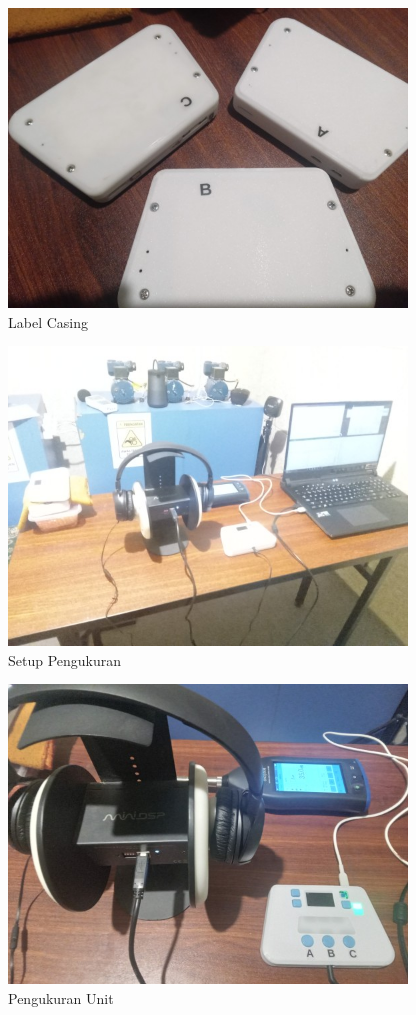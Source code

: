 \documentclass{article} %
\begin{document}
	\begin{figure}[!ht]
		\centering
		\includegraphics[width=300pt]{images/label_casing}
		\caption{Label Casing}
	\end{figure}

	\begin{figure}[!ht]
		\centering
		\includegraphics[width=300pt]{images/setup_pengukuran}
		\caption{Setup Pengukuran}
	\end{figure}

	\begin{figure}[!ht]
		\centering
		\includegraphics[width=300pt]{images/pengukuran_unit}
		\caption{Pengukuran Unit}
	\end{figure}
\end{document}
